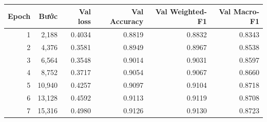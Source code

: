\begin{tabularx}{\linewidth}{rrrrrr}
\toprule
Epoch & Bước & Val loss & Val Accuracy & Val Weighted-F1 & Val Macro-F1\\\midrule
1 & 2,188 & 0.4034 & 0.8819 & 0.8832 & 0.8343\\
2 & 4,376 & 0.3581 & 0.8949 & 0.8967 & 0.8538\\
3 & 6,564 & 0.3548 & 0.9014 & 0.9031 & 0.8597\\
4 & 8,752 & 0.3717 & 0.9054 & 0.9067 & 0.8660\\
5 & 10,940 & 0.4257 & 0.9097 & 0.9104 & 0.8718\\
6 & 13,128 & 0.4592 & 0.9113 & 0.9119 & 0.8708\\
7 & 15,316 & 0.4980 & 0.9126 & 0.9130 & 0.8723\\
\bottomrule\end{tabularx}
